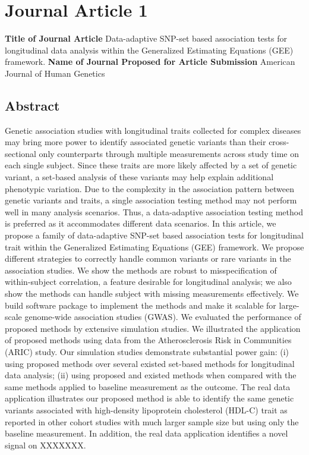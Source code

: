 \documentclass[12pt]{article}
\begin{document}
\section{Journal Article 1}\label{JA_1}
\textbf{Title of Journal Article}
Data-adaptive SNP-set based association tests for longitudinal data analysis within the Generalized Estimating Equations (GEE) framework.
\textbf{Name of Journal Proposed for Article Submission}
American Journal of Human Genetics

\subsection*{Abstract}
Genetic association studies with longitudinal traits collected for complex diseases may bring more power to identify associated genetic variants than their cross-sectional only counterparts through multiple measurements across study time on each single subject. Since these traits are more likely affected by a set of genetic variant, a set-based analysis of these variants may help explain additional phenotypic variation. Due to the complexity in the association pattern between genetic variants and traits, a single association testing method may not perform well in many analysis scenarios. Thus, a data-adaptive association testing method is preferred as it accommodates different data scenarios. In this article, we propose a family of data-adaptive SNP-set based association tests for longitudinal trait within the Generalized Estimating Equations (GEE) framework. We propose different strategies to correctly handle common variants or rare variants in the association studies. We show the methods are robust to misspecification of within-subject correlation, a feature desirable for longitudinal analysis; we also show the methods can handle subject with missing measurements effectively. We build software package to implement the methods and make it scalable for large-scale genome-wide association studies (GWAS). We evaluated the performance of proposed methods by extensive simulation studies. We illustrated the application of proposed methods using data from the Atherosclerosis Risk in Communities (ARIC) study. Our simulation studies demonstrate substantial power gain: (i) using proposed methods over several existed set-based methods for longitudinal data analysis; (ii) using proposed and existed methods when compared with the same methods applied to baseline measurement as the outcome. The real data application illustrates our proposed method is able to identify the same genetic variants associated with high-density lipoprotein cholesterol (HDL-C) trait as reported in other cohort studies with much larger sample size but using only the baseline measurement. In addition, the real data application identifies a novel signal on XXXXXXX.
\end{document}
